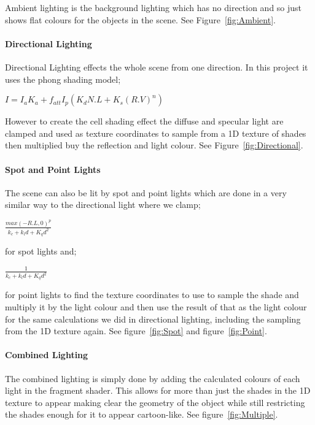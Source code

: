 \documentclass[10pt, a4paper]{article}
\begin{document}
	Ambient lighting is the background lighting which has no direction and so just shows flat colours for the objects in the scene. See Figure~\ref{fig:Ambient}.
	
	\paragraph{Directional Lighting}
	 
	 Directional Lighting effects the whole scene from one direction. In this project it uses the phong shading model;
	 
	 {\centering \(
	 	I = I_{a} K_{a}+f_{att}I_{p}(K_{d}N.L+K_{s}(R.V)^n)
	 	\)\par}
	 
	 However to create the cell shading effect the diffuse and specular light are clamped and used as texture coordinates to sample from a 1D texture of shades then multiplied buy the reflection and light colour. See Figure~\ref{fig:Directional}.
	 
	 \paragraph{Spot and Point Lights}
	 
	 The scene can also be lit by spot and point lights which are done in a very similar way to the directional light where we clamp;
	 
	  {\centering \Large\(
	  	\frac{max(-R.L,0)^p}{k_{c}+k_{l}d+K_{q}d^2}
	  	\)\par}
	  
	  for spot lights and;
	  
	  	  {\centering \Large\(
	  	  	\frac{1}{k_{c}+k_{l}d+K_{q}d^2}
	  	  	\)\par}
	  for point lights to find the texture coordinates to use to sample the shade and multiply it by the light colour and then use the result of that as the light colour for the same calculations we did in directional lighting, including the sampling from the 1D texture again. See figure~\ref{fig:Spot} and figure~\ref{fig:Point}.
	  
	  \paragraph{Combined Lighting}
	  
	  The combined lighting is simply done by adding the calculated colours of each light in the fragment shader. This allows for more than just the shades in the 1D texture to appear making clear the geometry of the object while still restricting the shades enough for it to appear cartoon-like. See figure~\ref{fig:Multiple}.
	  	 
\end{document}
